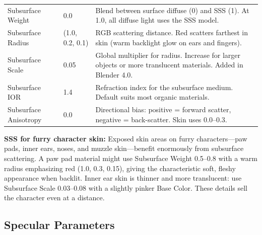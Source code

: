 \begin{center}
\begin{tabularx}{\textwidth}{L{4cm}C{2.5cm}X}
\toprule
{}
 &  &  \\
\midrule
Subsurface Weight & 0.0 & Blend between surface diffuse (0) and SSS (1). At 1.0, all diffuse light uses the SSS model. \\
Subsurface Radius & (1.0, 0.2, 0.1) & RGB scattering distance. Red scatters farthest in skin (warm backlight glow on ears and fingers). \\
Subsurface Scale & 0.05 & Global multiplier for radius. Increase for larger objects or more translucent materials. Added in Blender 4.0. \\
Subsurface IOR & 1.4 & Refraction index for the subsurface medium. Default suits most organic materials. \\
Subsurface Anisotropy & 0.0 & Directional bias: positive = forward scatter, negative = back-scatter. Skin uses 0.0--0.3. \\
\bottomrule
\end{tabularx}
\end{center}

\begin{furrybox}
\textbf{SSS for furry character skin:} Exposed skin areas on furry
characters---paw pads, inner ears, noses, and muzzle skin---benefit
enormously from subsurface scattering. A paw pad material might use
Subsurface Weight 0.5--0.8 with a warm radius emphasizing red
(1.0, 0.3, 0.15), giving the characteristic soft, fleshy
appearance when backlit. Inner ear skin is thinner and more
translucent: use Subsurface Scale 0.03--0.08 with a slightly
pinker Base Color. These details sell the character even at a
distance.
\end{furrybox}

\subsection{Specular Parameters}
\label{sec:shading:principled:specular}

